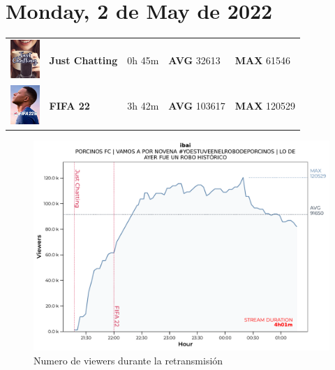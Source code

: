 \documentclass[a4paper,10pt,twoside]{report}
\begin{document}
\section*{Monday, 2 de May de 2022}
\begin{tabular}{m{1cm}llll}
 \includegraphics[width=1.1cm,center]{image0.jpg}  & \textbf{Just Chatting}   &  0h 45m &    \textbf{AVG} 32613  & \textbf{MAX} 61546\\
 \includegraphics[width=1.1cm,center]{image1.jpg}  & \textbf{FIFA 22}   &  3h 42m &    \textbf{AVG} 103617  & \textbf{MAX} 120529\\
\end{tabular}
\begin{figure}[H]
   \centering
   \includegraphics[width=1.000000\textwidth,left]{data/ibai_2022_05_03.pdf}
   \caption*{Numero de viewers durante la retransmisión}
   \end{figure}
\end{document}

